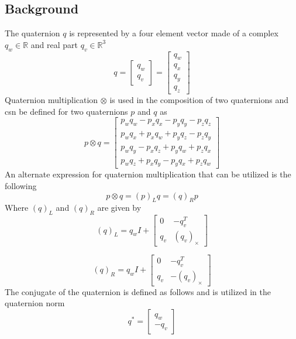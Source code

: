 \subsection{Background}
The quaternion $q$ is represented by a four element vector made of a complex $q_w \in \mathbb{R}$ and real part $q_v \in \mathbb{R}^3$
\begin{equation}
       q =  \begin{bmatrix}
                q_w \\
                q_v
            \end{bmatrix} 
            = \begin{bmatrix}
                q_w \\
                q_x \\
                q_y \\
                q_z
            \end{bmatrix} 
\label{eq: quaternion vector}
\end{equation}
Quaternion multiplication $\otimes$ is used in the composition of two quaternions and csn be defined for two quaternions $p$ and $q$ \cite{Quaternion_Kinematics_for_the_Error-state_EKF} as
\begin{equation}
       p \otimes q=\left[\begin{array}{l}p_w q_w-p_x q_x-p_y q_y-p_z q_z \\ p_w q_x+p_x q_w+p_y q_z-p_z q_y \\ p_w q_y-p_x q_z+p_y q_w+p_z q_x \\ p_w q_z+p_x q_y-p_y q_x+p_z q_w\end{array}\right]
\label{eq: quaternion multiplication}
\end{equation}
An alternate expression for quaternion multiplication that can be utilized is the following \cite{Quaternion_Kinematics_for_the_Error-state_EKF}
\begin{equation}
    p \otimes q = (p)_L q = (q)_R p
    \label{eq: alt q mult}
\end{equation}
Where $(q)_L$ and $(q)_R$ are given by 
\begin{equation}
    (q)_L = q_w I + \begin{bmatrix}
        0 & -q_v^T \\
        q_v & (q_v)_{\times}
    \end{bmatrix}
    \label{eq: (q)_L matrix}
\end{equation}

\begin{equation}
    (q)_R = q_w I + \begin{bmatrix}
        0 & -q_v^T \\
        q_v & -(q_v)_{\times}
    \end{bmatrix}
    \label{eq: (q)_R matrix}
\end{equation}
The conjugate of the quaternion is defined as follows and is utilized in the quaternion norm
\begin{equation}
    q^* = \begin{bmatrix}
                q_w \\
                -q_v
            \end{bmatrix} 
    \label{eq: quaterion conjugate}
\end{equation}

